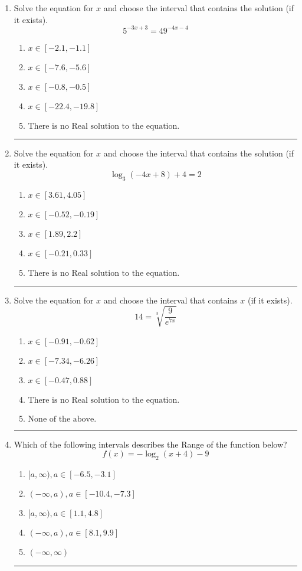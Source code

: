 \documentclass[14pt]{extbook}
\newcommand{\litem}[1]{\item#1\hspace*{-1cm}\rule{\textwidth}{0.4pt}}
\begin{document}
\begin{enumerate}
{\begin{enumerate}[label=\Alph*.]
\end{enumerate} }
\litem{
Solve the equation for $x$ and choose the interval that contains the solution (if it exists).\[ 5^{-3x+3} = 49^{-4x-4} \]\begin{enumerate}[label=\Alph*.]
\item \( x \in [-2.1, -1.1] \)
\item \( x \in [-7.6, -5.6] \)
\item \( x \in [-0.8, -0.5] \)
\item \( x \in [-22.4, -19.8] \)
\item \( \text{There is no Real solution to the equation.} \)

\end{enumerate} }
\litem{
Solve the equation for $x$ and choose the interval that contains the solution (if it exists).\[ \log_{3}{(-4x+8)}+4 = 2 \]\begin{enumerate}[label=\Alph*.]
\item \( x \in [3.61, 4.05] \)
\item \( x \in [-0.52, -0.19] \)
\item \( x \in [1.89, 2.2] \)
\item \( x \in [-0.21, 0.33] \)
\item \( \text{There is no Real solution to the equation.} \)

\end{enumerate} }
\litem{
 Solve the equation for $x$ and choose the interval that contains $x$ (if it exists).\[  14 = \sqrt[3]{\frac{9}{e^{7x}}} \]\begin{enumerate}[label=\Alph*.]
\item \( x \in [-0.91, -0.62] \)
\item \( x \in [-7.34, -6.26] \)
\item \( x \in [-0.47, 0.88] \)
\item \( \text{There is no Real solution to the equation.} \)
\item \( \text{None of the above.} \)

\end{enumerate} }
\litem{
Which of the following intervals describes the Range of the function below?\[ f(x) = -\log_2{(x+4)}-9 \]\begin{enumerate}[label=\Alph*.]
\item \( [a, \infty), a \in [-6.5, -3.1] \)
\item \( (-\infty, a), a \in [-10.4, -7.3] \)
\item \( [a, \infty), a \in [1.1, 4.8] \)
\item \( (-\infty, a), a \in [8.1, 9.9] \)
\item \( (-\infty, \infty) \)


\end{enumerate}}
\end{enumerate}
\end{document}
